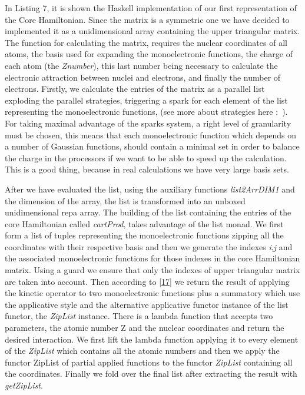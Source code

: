 \documentclass{tmr}
\begin{document}
In Listing 7, it is shown the Haskell implementation of our first representation of 
the Core Hamiltonian. Since the matrix is a symmetric one we have decided to implemented it
as a unidimensional array containing the upper triangular matrix.
The function for calculating the matrix, requires the nuclear coordinates of all atoms, the basis used
for expanding the monoelectronic functions, the charge of each atom (the \textit{Znumber}),
this last number being necessary to calculate the electronic attraction 
between nuclei and electrons, and finally the number of electrons. Firstly, we
calculate the entries of the matrix as a parallel list exploding the parallel strategies,
triggering a spark for each element of the list representing the monoelectronic functions, 
(see more about strategies here :~\cite{strategies}). For taking maximal advantage
of the sparks system, a right level of granularity must be chosen, this means that 
each monoelectronic function which depends on a number of Gaussian functions, should contain
a minimal set in order to balance the charge in the processors if we want to be able to
speed up the calculation. This is a good thing, because in real calculations we
have very large basis sets.

After we have evaluated the list, using the auxiliary functions \textit{list2ArrDIM1}
and the dimension of the array, the list is transformed into an unboxed unidimensional repa array.
The building of the list containing the entries of the core Hamiltonian called \textit{cartProd},
takes advantage of the list monad. We first form a list of tuples representing the monoelectronic
functions zipping all the coordinates with their respective basis and then we generate the
indexes \textit{i},\textit{j} and the associated monoelectronic functions for those 
indexes in the core Hamiltonian matrix. Using a guard we ensure that only the indexes of
upper triangular matrix are taken into account. Then according to \eqref{17} we return
the result of applying the kinetic operator to two monoelectronic functions plus a summatory
which use the applicative style and the alternative applicative functor instance of the list functor, the
\textit{ZipList} instance. There is a lambda function that accepts two parameters, the atomic number Z and
the nuclear coordinates and return the desired interaction.  We first lift the lambda function applying it
to every element of the \textit{ZipList} which contains all the atomic numbers and then we apply the 
functor ZipList of partial applied functions to the functor \textit{ZipList} 
containing all the coordinates. Finally we fold over the final list after extracting
the result with \textit{getZipList}.
\end{document}
